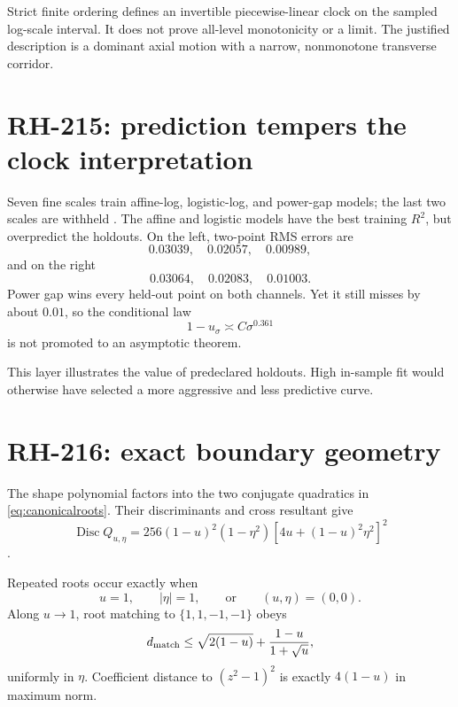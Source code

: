 \documentclass[12pt]{article}
\theoremstyle{remark}\newtheorem{remark}[theorem]{Remark}
\begin{document}
Strict finite ordering defines an invertible piecewise-linear clock on the
sampled log-scale interval.  It does not prove all-level monotonicity or a
limit.  The justified description is a dominant axial motion with a narrow,
nonmonotone transverse corridor.

\section{RH-215: prediction tempers the clock interpretation}

Seven fine scales train affine-log, logistic-log, and power-gap models; the
last two scales are withheld \citep{WangRH215}.  The affine and logistic
models have the best training $R^2$, but overpredict the holdouts.  On the
left, two-point RMS errors are
\begin{equation}
 0.03039,\quad0.02057,\quad0.00989,
\end{equation}
and on the right
\begin{equation}
 0.03064,\quad0.02083,\quad0.01003.
\end{equation}
Power gap wins every held-out point on both channels.  Yet it still misses by
about $0.01$, so the conditional law
\begin{equation}
 1-u_\sigma\asymp C\sigma^{0.361}
\end{equation}
is not promoted to an asymptotic theorem.

This layer illustrates the value of predeclared holdouts.  High in-sample
fit would otherwise have selected a more aggressive and less predictive
curve.

\section{RH-216: exact boundary geometry}

The shape polynomial factors into the two conjugate quadratics in
\eqref{eq:canonicalroots}.  Their discriminants and cross resultant give
\begin{equation}\label{eq:disc}
 \operatorname{Disc}Q_{u,\eta}
 =256(1-u)^2(1-\eta^2)
  [4u+(1-u)^2\eta^2]^2
\end{equation}
\citep{WangRH216}.

Repeated roots occur exactly when
\begin{equation}
 u=1,\qquad |\eta|=1,
 \qquad\text{or}\qquad (u,\eta)=(0,0).
\end{equation}
Along $u\to1$, root matching to $\{1,1,-1,-1\}$ obeys
\begin{equation}\label{eq:rootbound}
 d_{\rm match}\le \sqrt{2(1-u)}+\frac{1-u}{1+\sqrt u},
\end{equation}
uniformly in $\eta$.  Coefficient distance to $(z^2-1)^2$ is exactly
$4(1-u)$ in maximum norm.
\end{document}
